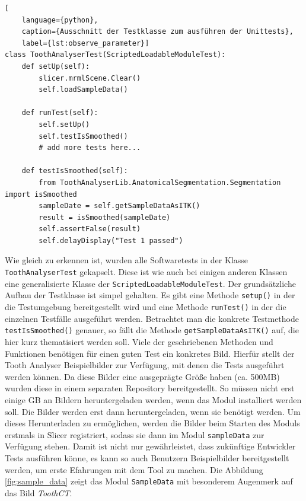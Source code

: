 \begin{lstlisting}[
    language={python},
    caption={Ausschnitt der Testklasse zum ausführen der Unittests},
    label={lst:observe_parameter}]
class ToothAnalyserTest(ScriptedLoadableModuleTest):
    def setUp(self):
	    slicer.mrmlScene.Clear()
	    self.loadSampleData()

    def runTest(self):
	    self.setUp()
	    self.testIsSmoothed()
	    # add more tests here...

    def testIsSmoothed(self):
	    from ToothAnalyserLib.AnatomicalSegmentation.Segmentation import isSmoothed
	    sampleDate = self.getSampleDataAsITK()
 	    result = isSmoothed(sampleDate)
	    self.assertFalse(result)
	    self.delayDisplay("Test 1 passed")
\end{lstlisting}

Wie gleich zu erkennen ist, wurden alle Softwaretests in der Klasse \texttt{ToothAnalyserTest}
gekapselt. Diese ist wie auch bei einigen anderen Klassen eine generalisierte
Klasse der \texttt{ScriptedLoadableModuleTest}. Der grundsätzliche Aufbau der
Testklasse ist simpel gehalten. Es gibt eine Methode \texttt{setup()} in der die
Testumgebung bereitgestellt wird und eine Methode \texttt{runTest()} in der die einzelnen
Testfälle ausgeführt werden. Betrachtet man die konkrete Testmethode \texttt{testIsSmoothed()}
genauer, so fällt die Methode \texttt{getSampleDataAsITK()} auf, die hier kurz
thematisiert werden soll. Viele der geschriebenen Methoden und Funktionen benötigen
für einen guten Test ein konkretes Bild. Hierfür stellt der Tooth Analyser
Beispielbilder zur Verfügung, mit denen die Tests ausgeführt werden können. Da
diese Bilder eine ausgeprägte Größe haben (ca. 500MB) wurden diese in einem separaten
Repository bereitgestellt. So müssen nicht erst einige \ac{GB} an Bildern heruntergeladen
werden, wenn das Modul installiert werden soll. Die Bilder werden erst dann heruntergeladen,
wenn sie benötigt werden. Um dieses Herunterladen zu ermöglichen, werden die
Bilder beim Starten des Moduls erstmals in Slicer registriert, sodass sie dann im
Modul \texttt{sampleData} zur Verfügung stehen. Damit ist nicht nur gewährleistet,
dass zukünftige Entwickler Tests ausführen könne, es kann so auch Benutzern Beispielbilder
bereitgestellt werden, um erste Efahrungen mit dem Tool zu machen. Die Abbildung
\ref{fig:sample_data} zeigt das Modul \texttt{SampleData} mit besonderem
Augenmerk auf das Bild \textit{ToothCT}.

